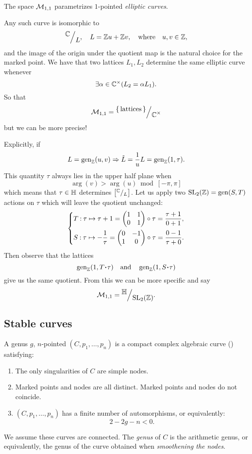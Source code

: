 \documentclass[12pt]{memoir}
\begin{document}
\begin{Ex}
    The space $\mathcal{M}_{1,1}$ parametrizes $1$-pointed \emph{elliptic curves}.\par
    Any such curve is isomorphic to 
    $$\quot{\bC}{L},\quad L=\bZ u+\bZ v,\word{where}u,v\in\bZ,$$
    and the image of the origin under the quotient map is the natural choice for the marked point. We have that two lattices $L_1,L_2$ determine the same elliptic curve whenever 
    $$\exists \alpha\in\mathbb{C}^\times(L_2=\alpha L_1).$$
    So that 
    $$\cM_{1,1}=\quot{\set{\text{lattices}}}{\bC^\x}$$
    but we can be more precise!\par
    Explicitly, if 
    $$L=\operatorname{gen}_{\mathbb{Z}}(u,v)\Rightarrow \tilde{L}=\frac{1}{u}L=\operatorname{gen}_{\mathbb{Z}}(1,\tau).$$
    This quantity $\tau$ always lies in the upper half plane when 
    $$\arg(v)>\arg(u)\bmod[-\pi,\pi]$$
    which means that $\tau\in\mathbb{H}$ determines $\bonj{\quot{\bC}{L}}$. 
    Let us apply two $\mathrm{SL}_2(\mathbb{Z})=\operatorname{gen}(S,T)$ actions on $\tau$ which will leave the quotient unchanged:
    $$
    \left\lbrace
    \begin{aligned}
        &T\mathbin{:}\tau\mapsto\tau+1=\begin{pmatrix} 1 & 1 \\ 0 & 1 \end{pmatrix}\circ\tau=\frac{\tau+1}{0+1},\\
        &S\mathbin{:}\tau\mapsto-\frac1\tau=\begin{pmatrix} 0 & -1 \\ 1 & 0 \end{pmatrix}\circ\tau=\frac{0-1}{\tau+0}.
    \end{aligned}
    \right.
    $$
    Then observe that the lattices
    $$\gen_\bZ(1,T\.\tau)\word{and}\gen_\bZ(1,S\.\tau)$$
    give us the same quotient. From this we can be more specific and say 
    $$\cM_{1,1}=\quot{\bH}{\rSL_2(\bZ)}.$$
\end{Ex}

\subsection{Stable curves}

\begin{Def}
    A genus $g$, $n$-pointed  $(C,p_1,\dots,p_n)$ is a compact complex algebraic curve () satisfying:
    \begin{enumerate}
        \item The only singularities of $C$ are simple nodes.
        \item Marked points and nodes are all distinct. Marked points and nodes do not coincide.
        \item\label{fin-number-auts} $(C,p_1,\dots,p_n)$ has a finite number of automorphisms, or equivalently:
        $$2-2g-n<0.$$
    \end{enumerate}
    We assume these curves are connected. The \emph{genus} of $C$ is the arithmetic genus, or equivalently, the genus of the curve obtained when \emph{smoothening the nodes}.
\end{Def}
\end{document}
